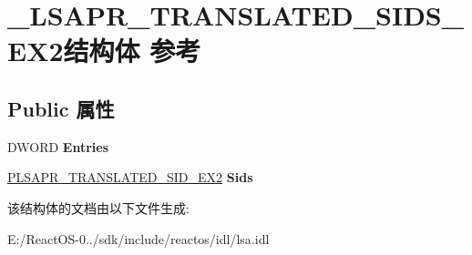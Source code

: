 \hypertarget{struct___l_s_a_p_r___t_r_a_n_s_l_a_t_e_d___s_i_d_s___e_x2}{}\section{\+\_\+\+L\+S\+A\+P\+R\+\_\+\+T\+R\+A\+N\+S\+L\+A\+T\+E\+D\+\_\+\+S\+I\+D\+S\+\_\+\+E\+X2结构体 参考}
\label{struct___l_s_a_p_r___t_r_a_n_s_l_a_t_e_d___s_i_d_s___e_x2}
\subsection*{Public 属性}
\begin{DoxyCompactItemize}
\item 
\mbox{\label{struct___l_s_a_p_r___t_r_a_n_s_l_a_t_e_d___s_i_d_s___e_x2_a5e551c7fd0f2f1bdaae0c0605a818bb2}} 
D\+W\+O\+RD {\bfseries Entries}
\item 
\mbox{\label{struct___l_s_a_p_r___t_r_a_n_s_l_a_t_e_d___s_i_d_s___e_x2_afeee6afb143eb4116e90e86addc9f4de}} 
\hyperlink{struct___l_s_a_p_r___t_r_a_n_s_l_a_t_e_d___s_i_d___e_x2}{P\+L\+S\+A\+P\+R\+\_\+\+T\+R\+A\+N\+S\+L\+A\+T\+E\+D\+\_\+\+S\+I\+D\+\_\+\+E\+X2} {\bfseries Sids}
\end{DoxyCompactItemize}


该结构体的文档由以下文件生成\+:\begin{DoxyCompactItemize}
\item 
E\+:/\+React\+O\+S-\/0../sdk/include/reactos/idl/lsa.\+idl\end{DoxyCompactItemize}
